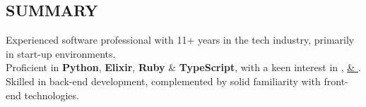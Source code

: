 \subsection*{SUMMARY}

\tbullet Experienced software professional with 11+ years in the tech industry, primarily in start-up environments. \\[1mm]
\tbullet Proficient in \textbf{Python}, \textbf{Elixir}, \textbf{Ruby} \& \textbf{TypeScript},
         with a keen interest in \href{https://github.com/ethan605/aws-vpn-client}{},
         \href{https://xkpasswd.ethanify.me}{ \& }. \\[1mm]
\tbullet Skilled in back-end development, complemented by solid familiarity with front-end technologies.
